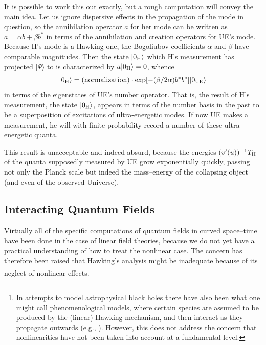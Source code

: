 \documentclass[
%
draft    %
,numberedheadings 
,bibliocites
  ]
  {aipproc}
\begin{document}
It is possible to work this out exactly, but a rough computation will convey the main idea.  Let us ignore dispersive effects in the propagation of the mode in question, so the annihilation operator $a$ for her mode can  be written as $a=\alpha b+\beta b^*$
in terms of the annihilation and creation operators for UE's mode. 
Because H's mode is a Hawking one, the Bogoliubov coefficients $\alpha$ and $\beta$ have comparable magnitudes.
Then the state $|0_{\rm H}\rangle$ which H's measurement has projected $|\Psi\rangle$ to is characterized by $a|0_{\rm H}\rangle =0$, whence
\begin{equation}
  |0_{\rm H}\rangle =\mbox{(normalization)}\cdot
  \exp [ -(\beta /2\alpha ) b^*b^*] |0_{\rm UE}\rangle
\end{equation}
in terms of the eigenstates of UE's number operator.  That is, the result of H's measurement, the state $|0_{\rm H}\rangle$, appears in terms of the number basis in the past to be a superposition of excitations of ultra-energetic modes.
If now UE makes a measurement, he will with finite probability record a number of these ultra-energetic quanta.

This result is unacceptable and indeed absurd, because the energies $(v'(u))^{-1}T_{\rm H}$ of the quanta supposedly measured by UE grow exponentially quickly, passing not only the Planck scale but indeed the mass--energy of the collapsing object (and even of the observed Universe).


\subsection{Interacting Quantum Fields}

Virtually all of the specific computations of quantum fields in curved space--time have been done in the case of linear field theories, because we do not yet have a practical understanding of how to treat the nonlinear case.  The concern has therefore been raised that Hawking's analysis might be inadequate because of its neglect of nonlinear effects.\footnote{In attempts to model astrophysical black holes there have also been what one might call phenomenological models, where certain species are assumed to be produced by the (linear) Hawking mechanism, and then interact as they propagate outwards (e.g.,  \citep{MacGibbon:1990zk}).  However, this does not address the concern that nonlinearities have not been taken into account at a fundamental level.}
\end{document}
